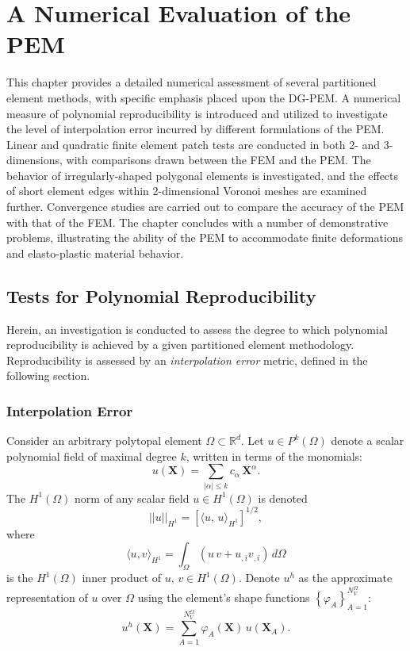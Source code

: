\chapter{A Numerical Evaluation of the PEM} \label{ch:results}
%
This chapter provides a detailed numerical assessment of several partitioned element methods, with specific emphasis placed upon the DG-PEM. A numerical measure of polynomial reproducibility is introduced and utilized to investigate the level of interpolation error incurred by different formulations of the PEM. Linear and quadratic finite element patch tests are conducted in both 2- and 3-dimensions, with comparisons drawn between the FEM and the PEM. The behavior of irregularly-shaped polygonal elements is investigated, and the effects of short element edges within 2-dimensional Voronoi meshes are examined further. Convergence studies are carried out to compare the accuracy of the PEM with that of the FEM. The chapter concludes with a number of demonstrative problems, illustrating the ability of the PEM to accommodate finite deformations and elasto-plastic material behavior.

\section{Tests for Polynomial Reproducibility}

Herein, an investigation is conducted to assess the degree to which polynomial reproducibility is achieved by a given partitioned element methodology. Reproducibility is assessed by an \textit{interpolation error} metric, defined in the following section.

\subsection*{Interpolation Error}

Consider an arbitrary polytopal element $\Omega \subset \mathbb{R}^d$. Let $u \in P^k (\Omega)$ denote a scalar polynomial field of maximal degree $k$, written in terms of the monomials:
\begin{equation}
        u (\mathbf{X}) = \sum_{|\alpha| \leq k} c_{\alpha} \, \mathbf{X}^{\alpha}.
\end{equation}
The $H^1(\Omega)$ norm of any scalar field $u \in H^1(\Omega)$ is denoted
\begin{equation}
        ||u||_{H^1} = \left[ \langle u, \, u \rangle_{H^1} \right]^{1/2},
\end{equation}
where
\begin{equation}
       \langle u,v \rangle_{H^1} = \int_{\Omega} (u \, v + u_{,i} v_{,i}) \, d\Omega
\end{equation}
is the $H^1(\Omega)$ inner product of $u, \,v \in H^1(\Omega)$. Denote $u^h$ as the approximate representation of $u$ over $\Omega$ using the element's shape functions $\left\{ \varphi_A \right\}_{A=1}^{N^\Omega_V}$:
\begin{equation}
        u^h (\mathbf{X}) = \sum_{A = 1}^{N^{\Omega}_V} \varphi_A (\mathbf{X}) \, u(\mathbf{X}_A).
\end{equation}

